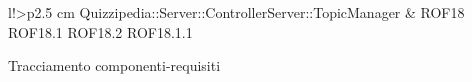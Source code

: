 \begin{tabella}{l!{\VRule}>{\centering\arraybackslash}p{2.5 cm}}
Quizzipedia::Server::ControllerServer::TopicManager & ROF18 \linebreak ROF18.1 \linebreak ROF18.2 \linebreak ROF18.1.1 \\
\caption{Tracciamento componenti-requisiti}
\end{tabella}
